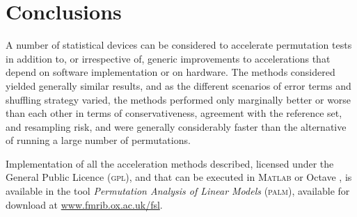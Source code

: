\section{Conclusions}

A number of statistical devices can be considered to accelerate permutation tests in addition to, or irrespective of, generic improvements to accelerations that depend on software implementation or on hardware. The methods considered yielded generally similar results, and as the different scenarios of error terms and shuffling strategy varied, the methods performed only marginally better or worse than each other in terms of conservativeness, agreement with the reference set, and resampling risk, and were generally considerably faster than the alternative of running a large number of permutations.

Implementation of all the acceleration methods described, licensed under the General Public Licence (\textsc{gpl}), and that can be executed in \textsc{Matlab} \citep{MATLAB2015} or Octave \citep{Eaton2015}, is available in the tool \emph{Permutation Analysis of Linear Models} (\textsc{palm}), available for download at \href{http://www.fmrib.ox.ac.uk/fsl}{www.fmrib.ox.ac.uk/fsl}.
